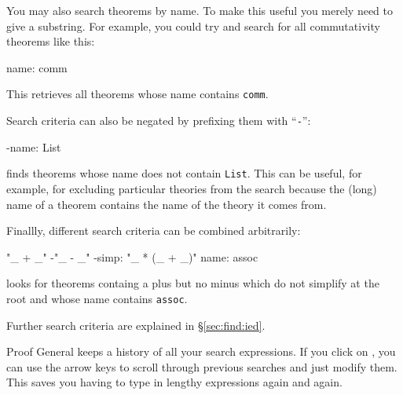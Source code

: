 \begin{isabellebody}
\begin{isamarkuptext}
You may also search theorems by name. To make this useful you merely
need to give a substring. For example, you could try and search for all
commutativity theorems like this:
\begin{ttbox}
name: comm
\end{ttbox}
This retrieves all theorems whose name contains \texttt{comm}.

Search criteria can also be negated by prefixing them with ``\texttt{-}'':
\begin{ttbox}
-name: List
\end{ttbox}
finds theorems whose name does not contain \texttt{List}. This can be useful,
for example, for
excluding particular theories from the search because the (long) name of
a theorem contains the name of the theory it comes from.

Finallly, different search criteria can be combined arbitrarily:
\begin{ttbox}
"_ + _"  -"_ - _"  -simp: "_ * (_ + _)"  name: assoc
\end{ttbox}
looks for theorems containg a plus but no minus which do not simplify
\mbox{\isa{{\isacharunderscore}\ {\isacharasterisk}\ {\isacharparenleft}{\isacharunderscore}\ {\isacharplus}\ {\isacharunderscore}{\isacharparenright}}} at the root and whose name contains \texttt{assoc}.

Further search criteria are explained in \S\ref{sec:find:ied}.

\begin{pgnote}
Proof General keeps a history of all your search expressions.
If you click on , you can use the arrow keys to scroll
through previous searches and just modify them. This saves you having
to type in lengthy expressions again and again.
\end{pgnote}%
\end{isamarkuptext}%
\isamarkuptrue%
\isamarkupfalse%
\end{isabellebody}%
